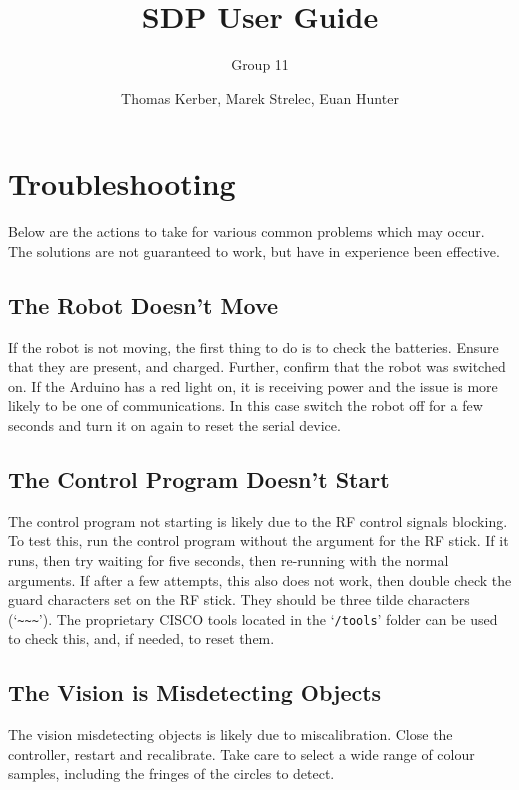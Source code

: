 \documentclass[a4paper,12pt]{scrartcl}
\author{Thomas Kerber, Marek Strelec, Euan Hunter}
\title{SDP User Guide}
\subtitle{Group 11}
\begin{document}
\maketitle





\section{Troubleshooting}

Below are the actions to take for various common problems which may occur. The
solutions are not guaranteed to work, but have in experience been effective.

\subsection{The Robot Doesn't Move}

If the robot is not moving, the first thing to do is to check the batteries.
Ensure that they are present, and charged. Further, confirm that the robot was
switched on. If the Arduino has a red light on, it is receiving power and the
issue is more likely to be one of communications. In this case switch the robot
off for a few seconds and turn it on again to reset the serial device.

\subsection{The Control Program Doesn't Start}

The control program not starting is likely due to the RF control signals
blocking. To test this, run the control program without the argument for the RF
stick. If it runs, then try waiting for five seconds, then re-running with the
normal arguments. If after a few attempts, this also does not work, then double
check the guard characters set on the RF stick. They should be three tilde
characters (`\verb$~~~$'). The proprietary CISCO tools located in the
`\texttt{/tools}' folder can be used to check this, and, if needed, to reset
them.

\subsection{The Vision is Misdetecting Objects}

The vision misdetecting objects is likely due to miscalibration. Close the
controller, restart and recalibrate. Take care to select a wide range of colour
samples, including the fringes of the circles to detect.
\end{document}
